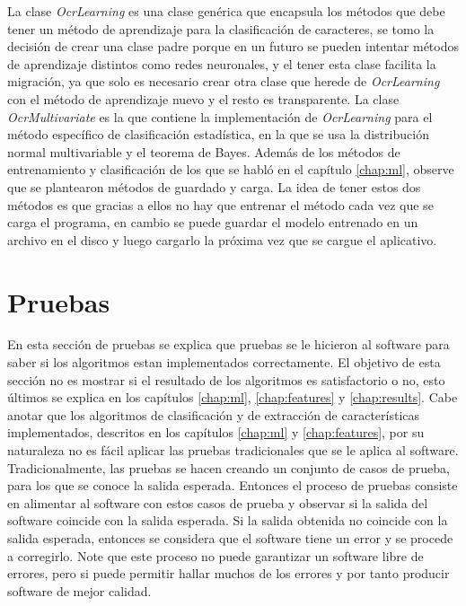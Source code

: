 \documentclass[a4paper, 11pt, oneside]{report}
\begin{document}
La clase {\it OcrLearning} es una clase genérica que encapsula los métodos que debe tener un método de aprendizaje para la clasificación de caracteres, se tomo la decisión de crear una clase padre porque en un futuro se pueden intentar métodos de aprendizaje distintos como redes neuronales, y el tener esta clase facilita la migración, ya que solo es necesario crear otra clase que herede de {\it OcrLearning} con el método de aprendizaje nuevo y el resto es transparente. La clase {\it OcrMultivariate} es la que contiene la implementación de {\it OcrLearning} para el método específico de clasificación estadística, en la que se usa la distribución normal multivariable y el teorema de Bayes. Además de los métodos de entrenamiento y clasificación de los que se habló en el capítulo \ref{chap:ml}, observe que se plantearon métodos de guardado y carga. La idea de tener estos dos métodos es que gracias a ellos no hay que entrenar el método cada vez que se carga el programa, en cambio se puede guardar el modelo entrenado en un archivo en el disco y luego cargarlo la próxima vez que se cargue el aplicativo.

\section{Pruebas}

En esta sección de pruebas se explica que pruebas se le hicieron al software para saber si los algoritmos estan implementados correctamente. El objetivo de esta sección no es mostrar si el resultado de los algoritmos es satisfactorio o no, esto últimos se explica en los capítulos \ref{chap:ml}, \ref{chap:features} y \ref{chap:results}. Cabe anotar que los algoritmos de clasificación y de extracción de características implementados, descritos en los capítulos \ref{chap:ml} y \ref{chap:features}, por su naturaleza no es fácil aplicar las pruebas tradicionales que se le aplica al software.\newline \newline
Tradicionalmente, las pruebas se hacen creando un conjunto de casos de prueba, para los que se conoce la salida esperada. Entonces el proceso de pruebas consiste en alimentar al software con estos casos de prueba y observar si la salida del software coincide con la salida esperada. Si la salida obtenida no coincide con la salida esperada, entonces se considera que el software tiene un error y se procede a corregirlo. Note que este proceso no puede garantizar un software libre de errores, pero si puede permitir hallar muchos de los errores y por tanto producir software de mejor calidad.
\end{document}
